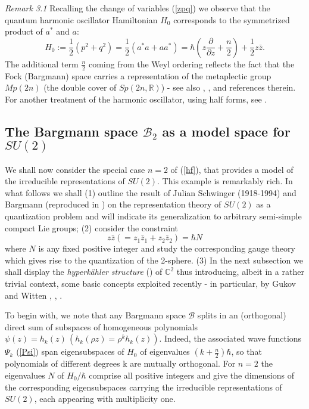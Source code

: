 {\it Remark 3.1} Recalling the change of variables (\ref{zpq}) we observe that the quantum harmonic oscillator Hamiltonian $H_0$ corresponds to the symmetrized product
of $a^*$ and $a$:
\begin{equation}
\label{osc}
H_0 := \frac{1}{2}(p^2 + q^2) = \frac{1}{2}(a^* a + a a^*) = 
\hbar (z\frac{\partial}{\partial z} + \frac{n}{2}) + \frac{1}{2}z\bar z.
\end{equation}
The additional term $\frac{n}{2}$ coming from the Weyl ordering reflects the fact that the Fock (Bargmann) space carries a representation of the metaplectic group
$Mp(2n)$ (the double cover of $Sp(2n, {\mathbb R})$) \cite{W64} - see also \cite{F}, \cite{deG}, \cite{T10} and references therein. For another treatment of the harmonic 
oscillator, using half forms, see \cite{B}.

\smallskip

\subsection{The Bargmann space ${\mathcal B}_2$ as a model space for $SU(2)$}
 
\smallskip
                                 
We shall now consider the special case $n=2$ of (\ref{hf}), that provides a model of the irreducible representations of $SU(2)$.  This example is remarkably rich. In what follows we shall (1) outline the result of Julian Schwinger (1918-1994) \cite{Sc} and Bargmann \cite{B62} (reproduced in \cite{QTAM}) on the representation theory of $SU(2)$ as a quantization problem and will indicate its generalization to arbitrary semi-simple compact Lie groups; (2) consider the constraint
\begin{equation}
\label{zp}
z\bar{z} (= z_1\bar{z}_1 + z_2\bar{z}_2) = \hbar N   
\end{equation}
where $N$ is any fixed positive integer and study the corresponding gauge theory which gives rise to the quantization of the 2-sphere.
(3) In the next subsection we shall display the {\it hyperk\"ahler structure} (\cite{Hi}) of
 ${\mathbb C}^2$ thus introducing, albeit in a rather trivial context, some basic concepts 
exploited recently - in particular, by Gukov and Witten \cite{GW}, \cite{G10}, \cite{W10}.

To begin with, we note that any Bargmann space ${\mathcal B}$ splits in an (orthogonal) direct sum of
subspaces of homogeneous polynomials $\psi(z) = h_k(z) \, (h_k(\rho z) = \rho^k h_k(z))$. Indeed, the
associated wave functions $\Psi_k$ (\ref{Psi}) span eigensubspaces of $H_0$ of eigenvalues $(k + 
\frac{n}{2})\hbar$, so that polynomials of different degrees k are mutually orthogonal. For $n=2$ the 
eigenvalues $N$ of $H_0/\hbar$ comprise all positive integers and give the dimensions of the corresponding 
eigensubspaces carrying the irreducible representations of $SU(2)$, each appearing with multiplicity one. 

